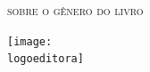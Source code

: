 \documentclass{article}
\begin{document}
\begin{frame}
\hfill\Huge
\textsc{sobre o gênero do livro}
\end{frame}




\begin{frame}
\centering\hfill\texttt{[image: \\logoeditora]}
\end{frame}
\end{document}

